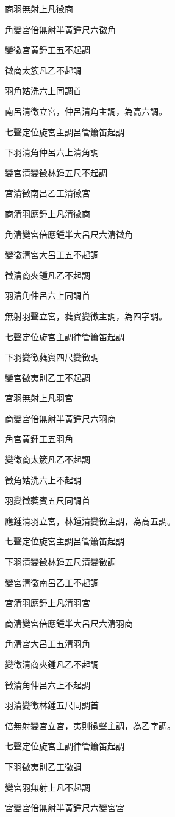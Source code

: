 \begin{pinyinscope}
商羽無射上凡徵商

角變宮倍無射半黃鍾尺六徵角

變徵宮黃鍾工五不起調

徵商太簇凡乙不起調

羽角姑洗六上同調首

南呂清徵立宮，仲呂清角主調，為高六調。

七聲定位旋宮主調呂管簫笛起調

下羽清角仲呂六上清角調

變宮清變徵林鍾五尺不起調

宮清徵南呂乙工清徵宮

商清羽應鍾上凡清徵商

角清變宮倍應鍾半大呂尺六清徵角

變徵清宮大呂工五不起調

徵清商夾鍾凡乙不起調

羽清角仲呂六上同調首

無射羽聲立宮，蕤賓變徵主調，為四字調。

七聲定位旋宮主調律管簫笛起調

下羽變徵蕤賓四尺變徵調

變宮徵夷則乙工不起調

宮羽無射上凡羽宮

商變宮倍無射半黃鍾尺六羽商

角宮黃鍾工五羽角

變徵商太簇凡乙不起調

徵角姑洗六上不起調

羽變徵蕤賓五尺同調首

應鍾清羽立宮，林鍾清變徵主調，為高五調。

七聲定位旋宮主調呂管簫笛起調

下羽清變徵林鍾五尺清變徵調

變宮清徵南呂乙工不起調

宮清羽應鍾上凡清羽宮

商清變宮倍應鍾半大呂尺六清羽商

角清宮大呂工五清羽角

變徵清商夾鍾凡乙不起調

徵清角仲呂六上不起調

羽清變徵林鍾五尺同調首

倍無射變宮立宮，夷則徵聲主調，為乙字調。

七聲定位旋宮主調律管簫笛起調

下羽徵夷則乙工徵調

變宮羽無射上凡不起調

宮變宮倍無射半黃鍾尺六變宮宮


\end{pinyinscope}
